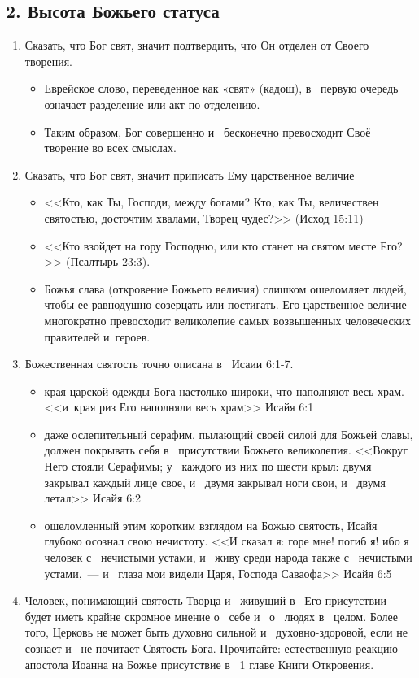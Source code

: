 \documentclass[a4paper,12pt]{article}
\begin{document}
\subsection{2. Высота Божьего статуса}        
            
\begin{enumerate}    

    \item Сказать, что Бог свят, значит подтвердить, что Он отделен от Своего творения.
    \begin{itemize}
        \item Еврейское слово, переведенное как «свят» (кадош), в~ первую очередь означает разделение или акт по отделению.
        \item Таким образом, Бог совершенно и~ бесконечно превосходит Своё творение во всех смыслах.
    \end{itemize}
    \item Сказать, что Бог свят, значит приписать Ему царственное величие
    \begin{itemize}
        \item <<Кто, как Ты, Господи, между богами? Кто, как Ты, величествен святостью, досточтим хвалами, Творец чудес?>> (Исход 15:11)
        \item <<Кто взойдет на гору Господню, или кто станет на святом месте Его?>> (Псалтырь 23:3).
        \item Божья слава (откровение Божьего величия) слишком ошеломляет людей, чтобы ее равнодушно созерцать или постигать. Его царственное величие многократно превосходит великолепие самых возвышенных человеческих правителей и~героев.
    \end{itemize}
    \item Божественная святость точно описана в~ Исаии 6:1-7.
    \begin{itemize}
        \item края царской одежды Бога настолько широки, что наполняют весь храм. <<и~края риз Его наполняли весь храм>> Исайя 6:1
        \item даже ослепительный серафим, пылающий своей силой для Божьей славы, должен покрывать себя в~ присутствии Божьего великолепия. <<Вокруг Него стояли Серафимы; у~ каждого из них по шести крыл: двумя закрывал каждый лице свое, и~ двумя закрывал ноги свои, и~ двумя летал>> Исайя 6:2
        \item ошеломленный этим коротким взглядом на Божью святость, Исайя глубоко осознал свою нечистоту. <<И сказал я: горе мне! погиб я! ибо я~ человек с~ нечистыми устами, и~ живу среди народа также с~ нечистыми устами,~--- и~ глаза мои видели Царя, Господа Саваофа>> Исайя 6:5
    \end{itemize}
    \item Человек, понимающий святость Творца и~ живущий в~ Его присутствии будет иметь крайне скромное мнение о~ себе и~ о~ людях в~ целом. Более того, Церковь не может быть духовно сильной и~ духовно-здоровой, если не сознает и~ не почитает Святость Бога. Прочитайте: естественную реакцию апостола Иоанна на Божье присутствие в~ 1 главе Книги Откровения.
\end{enumerate}
\end{document}
